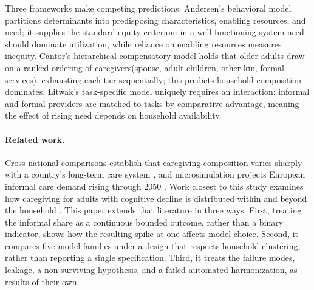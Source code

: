 \documentclass[9pt,twoside]{pnas-new}
\begin{document}
Three frameworks make competing predictions. Andersen's behavioral model \cite{andersen1995} partitions determinants into predisposing
characteristics, enabling resources, and need; it supplies the standard equity criterion: in a well-functioning system need should
dominate utilization, while reliance on enabling resources measures inequity. Cantor's hierarchical compensatory model \cite{cantor1979} holds that older
adults draw on a ranked ordering of caregivers(spouse, adult children, other kin, formal services), exhausting each tier sequentially; this predicts household composition dominates. Litwak's task-specific model \cite{litwak1985} uniquely requires an interaction: informal and formal providers are matched to tasks by comparative advantage, meaning the effect of rising need depends on household availability.

\paragraph{Related work.} Cross-national comparisons establish that caregiving composition varies sharply with a country's long-term care system \cite{jang2012,oecd2023}, and microsimulation projects European
informal care demand rising through 2050 \cite{cattaneo2025}. Work closest to
this study examines how caregiving for adults with cognitive decline is
distributed within and beyond the household \cite{geronb2025}. This paper
extends that literature in three ways. First, treating the informal share as a continuous bounded outcome, rather than a binary indicator, shows how the resulting spike at one affects model choice. Second, it compares five model families
under a design that respects household clustering, rather than reporting a
single specification. Third, it treats the failure modes, leakage, a
non-surviving hypothesis, and a failed automated harmonization, as
results of their own.\Parasplit

%

\end{document}

